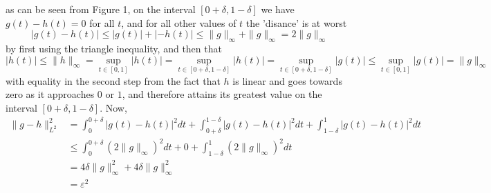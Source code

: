 \documentclass[../thesis.tex]{subfiles}
\begin{document}
as can be seen from Figure 1, on the interval $[0+\delta, 1-\delta]$ we have $g(t)-h(t)= 0$ for all $t$, and for all other values of $t$ the 'disance' is at worst 
\begin{equation*}
    \left|g(t)-h(t) \right| \leq |g(t)| + |-h(t)| \leq \|g \|_{\infty} + \|g \|_{\infty} = 2 \|g \|_{\infty}
\end{equation*}
by first using the triangle inequality, and then that
\begin{equation*}
    |h(t)| \leq \|h\|_{\infty} = \sup_{t\in[0,1]} |h(t)| = \sup_{t\in[0+\delta, 1-\delta]} |h(t)| = \sup_{t\in[0+\delta, 1-\delta]} |g(t)| \leq \sup_{t\in[0, 1]} |g(t)| =\| g\|_{\infty}
\end{equation*}
with equality in the second step from the fact that $h$ is linear and goes towards zero as it approaches $0$ or $1$, and therefore attains its greatest value on the interval $[0+\delta,1-\delta]$. Now,
\begin{align*}
    \| g-h \|_{L^2}^2 &=  \int_0^{0+\delta} \left|g(t)-h(t) \right|^2dt + \int_{0+\delta}^{1-\delta} \left|g(t)-h(t) \right|^2dt +\int_{1-\delta}^{1} \left|g(t)-h(t) \right|^2dt\\ 
    &\leq \int_0^{0+\delta} (2 \| g\|_\infty)^2dt + 0 +\int_{1-\delta}^{1} (2 \| g\|_\infty)^2dt\\
    &=  4 \delta \| g\|_\infty^2 + 4 \delta \| g\|_\infty^2\\ 
    &= \varepsilon^2
\end{align*}
\end{document}
